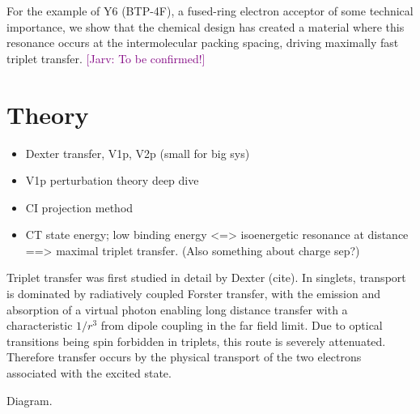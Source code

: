\documentclass[aps,physrev,reprint,superscriptaddress,nofootinbib,amsmath,amssymb,a4paper]{revtex4-2}
\newcommand{\jarv}[1]{\textcolor{purple}{[Jarv: #1]}}
\begin{document}
For the example of Y6 (BTP-4F), a fused-ring electron acceptor of some technical importance, we show that the chemical design has created a material where this resonance occurs at the intermolecular packing spacing, driving maximally fast triplet transfer. 
\jarv{To be confirmed!}

\section{Theory}\label{theory}

\begin{itemize}
    \item Dexter transfer, V1p, V2p (small for big sys)
    \item V1p perturbation theory deep dive
    \item CI projection method
    \item CT state energy; low binding energy <=> isoenergetic resonance at distance ==> maximal triplet transfer. (Also something about charge sep?)
\end{itemize}

Triplet transfer was first studied in detail by Dexter (cite). In singlets, transport is dominated by radiatively coupled Forster transfer, with the emission and absorption of a virtual photon enabling long distance transfer with a characteristic $1/r^3$ from dipole coupling in the far field limit. Due to optical transitions being spin forbidden in triplets, this route is severely attenuated. Therefore transfer occurs by the physical transport of the two electrons associated with the excited state. 

Diagram.
\end{document}
